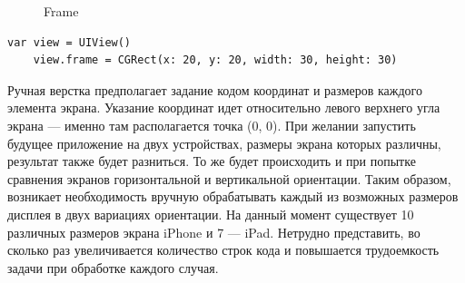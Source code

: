 \begin{figure}[h!]
	\caption{Frame}
	\label{fig:frame}
\end{figure}

\begin{lstlisting}[label=lst:code1, caption=Задание свойства frame для UIView]
	var view = UIView()
	view.frame = CGRect(x: 20, y: 20, width: 30, height: 30)
\end{lstlisting}

Ручная верстка предполагает задание кодом координат и размеров каждого элемента экрана. 
Указание координат идет относительно левого верхнего угла экрана --- именно там располагается точка (0, 0). 
При желании запустить будущее приложение на двух устройствах, размеры экрана которых различны, результат также будет разниться. 
То же будет происходить и при попытке сравнения экранов горизонтальной и вертикальной ориентации. 
Таким образом, возникает необходимость вручную обрабатывать каждый из возможных размеров дисплея в двух вариациях ориентации. 
На данный момент существует 10 различных размеров экрана iPhone и 7 --- iPad. 
Нетрудно представить, во сколько раз увеличивается количество строк кода и повышается трудоемкость задачи при обработке каждого случая. 

